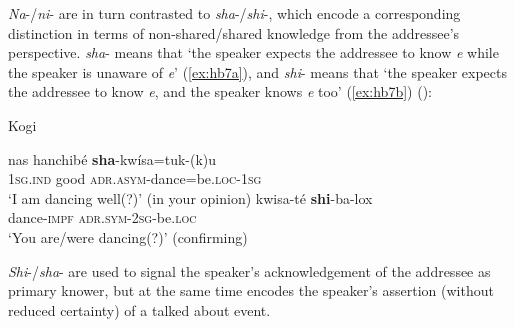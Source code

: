 \documentclass[output=paper]{langsci/langscibook}
\begin{document}
\textit{Na}-/\textit{ni}- are in turn contrasted to \textit{sha}-/\textit{shi}-, which encode a corresponding distinction in terms of non-shared/shared knowledge from the addressee’s perspective. \textit{sha}- means that ‘the speaker expects the addressee to know \textit{e} while the speaker is unaware of \textit{e}’ (\ref{ex:hb7a}), and \textit{shi}- means that ‘the speaker expects the addressee to know \textit{e}, and the speaker knows \textit{e} too’ (\ref{ex:hb7b}) (\citealt[3]{Bergqvist2016}):


\begin{exe}
\ex Kogi\label{ex:hb7}
	\begin{xlist}
	\ex \label{ex:hb7a}
	\gll nas	 hanchibé \textbf{sha}-kwísa=tuk-(k)u\\
	1\textsc{sg}.\textsc{ind}	good \textsc{adr}.\textsc{asym}-dance=be.\textsc{loc}-1\textsc{sg}\\
	\trans ‘I am dancing well(?)’ (in your opinion) 
	\ex \label{ex:hb7b}
	\gll kwisa-té	\textbf{shi}-ba-lox\\
	dance-\textsc{impf}	\textsc{adr}.\textsc{sym}-2\textsc{sg}-be.\textsc{loc}\\
	\trans ‘You are/were dancing(?)’ (confirming)  
	\end{xlist}
\end{exe}

\textit{Shi}-/\textit{sha}- are used to signal the speaker’s acknowledgement of the addressee as primary knower, but at the same time encodes the speaker’s assertion (without reduced certainty) of a talked about event. 
\end{document}

